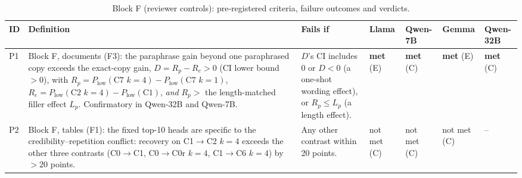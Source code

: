 \begin{table}[!htbp]\centering\scriptsize
\begin{tabular}{@{}p{0.6cm}p{5.4cm}p{3.6cm}p{1.15cm}p{1.15cm}p{1.15cm}p{1.15cm}@{}}\toprule
ID & Definition & Fails if & Llama & Qwen-7B & Gemma & Qwen-32B \\ \midrule
P1 & Block F, documents (F3): the paraphrase gain beyond one paraphrased copy exceeds the exact-copy gain, $D = R_p - R_e > 0$ (CI lower bound $>0$), with $R_p = P_{\text{low}}(\text{C7 } k{=}4) - P_{\text{low}}(\text{C7 } k{=}1)$, $R_e = P_{\text{low}}(\text{C2 } k{=}4) - P_{\text{low}}(\text{C1})$, \emph{and} $R_p >$ the length-matched filler effect $L_p$. Confirmatory in Qwen-32B and Qwen-7B. & $D$'s CI includes 0 or $D<0$ (a one-shot wording effect), or $R_p \le L_p$ (a length effect). & \textbf{met} (E) & \textbf{met} (C) & \textbf{met} (E) & \textbf{met} (C) \\
P2 & Block F, tables (F1): the fixed top-10 heads are specific to the credibility--repetition conflict: recovery on C1$\to$C2 $k{=}4$ exceeds the other three contrasts (C0$\to$C1, C0$\to$C0r $k{=}4$, C1$\to$C6 $k{=}4$) by $>$20 points. & Any other contrast within 20 points. & not met (C) & not met (C) & not met (C) & -- \\
\bottomrule\end{tabular}\caption{Block F (reviewer controls): pre-registered criteria, failure outcomes and verdicts.}\label{tab:prereg_f}\end{table}

